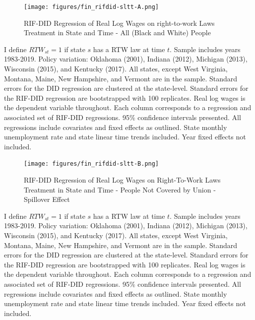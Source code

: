 \documentclass[11pt]{article}
\begin{document}
{\pagebreak
\begin{landscape}
\begin{figure}[ht!]
\centering
    \caption{RIF-DID Regression of Real Log Wages on right-to-work Laws Treatment in State and Time - All (Black and White) People}\label{fig:rifdid-sltt-A}
    \texttt{[image: figures/fin\_rifdid-sltt-A.png]}
\end{figure}
\footnotesize{I define $RTW_{st} = 1$ if state $s$ has a RTW law at time $t$. Sample includes years 1983-2019. Policy variation: Oklahoma (2001), Indiana (2012), Michigan (2013), Wisconsin (2015), and Kentucky (2017). All states, except West Virginia, Montana, Maine, New Hampshire, and Vermont are in the sample. Standard errors for the DID regression are clustered at the state-level. Standard errors for the RIF-DID regression are bootstrapped with 100 replicates. Real log wages is the dependent variable throughout. Each column corresponds to a regression and associated set of RIF-DID regressions. 95\% confidence intervals presented. All regressions include covariates and fixed effects as outlined. State monthly unemployment rate and state linear time trends included. Year fixed effects not included.}
\end{landscape}

\pagebreak
\begin{landscape}
\begin{figure}[ht!]
\centering
    \caption{RIF-DID Regression of Real Log Wages on Right-To-Work Laws Treatment in State and Time - People Not Covered by Union - Spillover Effect}\label{fig:rifdid-sltt-B}
    \texttt{[image: figures/fin\_rifdid-sltt-B.png]}
\end{figure}
\footnotesize{I define $RTW_{st} = 1$ if state $s$ has a RTW law at time $t$. Sample includes years 1983-2019. Policy variation: Oklahoma (2001), Indiana (2012), Michigan (2013), Wisconsin (2015), and Kentucky (2017). All states, except West Virginia, Montana, Maine, New Hampshire, and Vermont are in the sample. Standard errors for the DID regression are clustered at the state-level. Standard errors for the RIF-DID regression are bootstrapped with 100 replicates. Real log wages is the dependent variable throughout. Each column corresponds to a regression and associated set of RIF-DID regressions. 95\% confidence intervals presented. All regressions include covariates and fixed effects as outlined. State monthly unemployment rate and state linear time trends included. Year fixed effects not included.}
\end{landscape}

}
\end{document}
